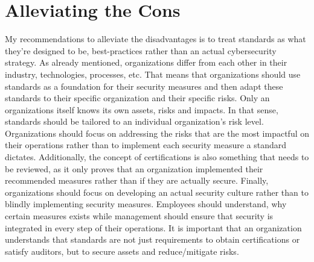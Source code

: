 \documentclass[12pt]{article}
\begin{document}
\section{Alleviating the Cons}
My recommendations to alleviate the disadvantages is to treat standards as what they're designed to be, best-practices rather than an actual cybersecurity strategy. As already mentioned, organizations differ from each other in their industry, technologies, processes, etc. That means that organizations should use standards as a foundation for their security measures and then adapt these standards to their specific organization and their specific risks. Only an organizations itself knows its own assets, risks and impacts.
\newline
In that sense, standards should be tailored to an individual organization's risk level. Organizations should focus on addressing the risks that are the most impactful on their operations rather than to implement each security measure a standard dictates.
\newline
Additionally, the concept of certifications is also something that needs to be reviewed, as it only proves that an organization implemented their recommended measures rather than if they are actually secure.
\newline
Finally, organizations should focus on developing an actual security culture rather than to blindly implementing security measures. Employees should understand, why certain measures exists while management should ensure that security is integrated in every step of their operations. It is important that an organization understands that standards are not just requirements to obtain certifications or satisfy auditors, but to secure assets and reduce/mitigate risks.
\end{document}
